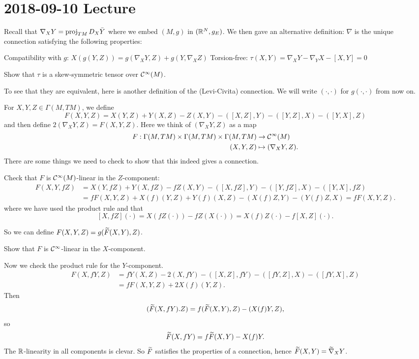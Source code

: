 \section{2018-09-10 Lecture}

Recall that $\nabla_XY=\operatorname{proj}_{TM}D_X\bar Y$ where we embed $(M,g)$ in $(\mathbb{R}^N,g_E)$.
We then gave an alternative definition: $\nabla$ is the unique connection satisfying the following properties:
\begin{enum}
  \io Compatibility with $g$: $X(g(Y,Z)) = g(\nabla_XY,Z) + g(Y,\nabla_XZ)$
  \io Torsion-free: $\tau(X,Y) = \nabla_XY - \nabla_YX - [X,Y] = 0$
\end{enum}

\begin{exer}
  Show that $\tau$ is a skew-symmetric tensor over $\mathcal{C}^\infty(M)$.
\end{exer}

To see that they are equivalent, here is another definition of the (Levi-Civita) connection.
We will write $(\cdot,\cdot)$ for $g(\cdot,\cdot)$ from now on.

For $X,Y,Z\in\Gamma(M,TM)$, we define
\[ F(X,Y,Z) = X(Y,Z) + Y(X,Z) - Z(X,Y) - ([X,Z],Y) - ([Y,Z],X) - ([Y,X],Z) \]
and then define $2(\nabla_XY,Z)=F(X,Y,Z)$.
Here we think of $(\nabla_XY,Z)$ as a map
\begin{align*}
  F: \Gamma(M,TM)\times\Gamma(M,TM)\times\Gamma(M,TM) &\to \mathcal{C}^\infty(M) \\
  (X,Y,Z) &\mapsto (\nabla_XY,Z).
\end{align*}
There are some things we need to check to show that this indeed gives a connection.

Check that $F$ is $\mathcal{C}^\infty(M)$-linear in the $Z$-component:
\begin{align*}
  F(X,Y,fZ) &= X(Y,fZ) + Y(X,fZ) - fZ(X,Y) - ([X,fZ],Y) - ([Y,fZ],X) - ([Y,X],fZ) \\
  &= fF(X,Y,Z) + X(f)(Y,Z) + Y(f)(X,Z) - (X(f)Z,Y) - (Y(f)Z,X) = fF(X,Y,Z).
\end{align*}
where we have used the product rule and that
\[ [X,fZ](\cdot) = X(fZ(\cdot)) - fZ(X(\cdot)) = X(f)Z(\cdot) - f[X,Z](\cdot). \]

So we can define $F(X,Y,Z)=g(\widetilde F(X,Y),Z)$.

\begin{exer}
  Show that $F$ is $\mathcal{C}^\infty$-linear in the $X$-component.
\end{exer}

Now we check the product rule for the $Y$-component.
\begin{align*}
  F(X,fY,Z) &= fY(X,Z) - 2(X,fY) - ([X,Z],fY) - ([fY,Z],X) - ([fY,X],Z) \\
  &= fF(X,Y,Z) + 2X(f)(Y,Z).
\end{align*}
Then
\[ (\widetilde F(X,fY).Z) = f(\widetilde F(X,Y),Z) - (X(f)Y,Z), \]
so
\[ \widetilde F(X,fY) = f\widetilde F(X,Y) - X(f)Y. \]
The $\mathbb{R}$-linearity in all components is clevar.
So $\widetilde F$ satisfies the properties of a connection, hence $\widetilde F(X,Y)=\widetilde\nabla_XY$.

